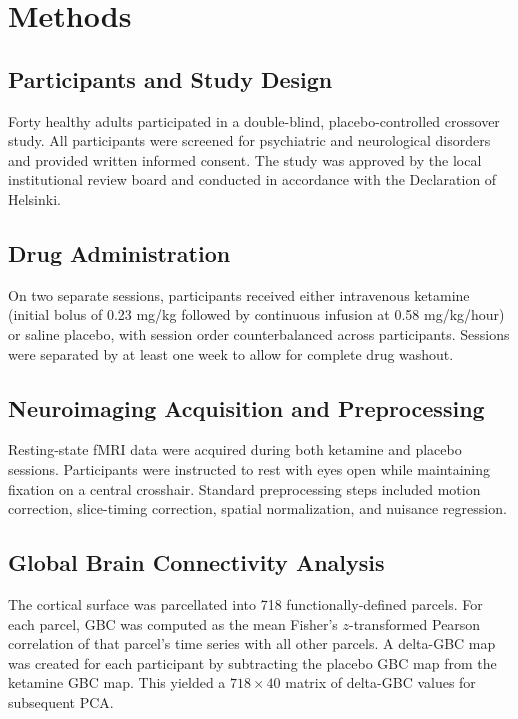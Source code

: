 \documentclass[12pt]{article}
\begin{document}
\section{Methods}

\subsection{Participants and Study Design}

Forty healthy adults participated in a double-blind, placebo-controlled crossover study. All participants were screened for psychiatric and neurological disorders and provided written informed consent. The study was approved by the local institutional review board and conducted in accordance with the Declaration of Helsinki.

\subsection{Drug Administration}

On two separate sessions, participants received either intravenous ketamine (initial bolus of 0.23 mg/kg followed by continuous infusion at 0.58 mg/kg/hour) or saline placebo, with session order counterbalanced across participants. Sessions were separated by at least one week to allow for complete drug washout.

\subsection{Neuroimaging Acquisition and Preprocessing}

Resting-state fMRI data were acquired during both ketamine and placebo sessions. Participants were instructed to rest with eyes open while maintaining fixation on a central crosshair. Standard preprocessing steps included motion correction, slice-timing correction, spatial normalization, and nuisance regression.

\subsection{Global Brain Connectivity Analysis}

The cortical surface was parcellated into 718 functionally-defined parcels. For each parcel, GBC was computed as the mean Fisher's $z$-transformed Pearson correlation of that parcel's time series with all other parcels. A delta-GBC map was created for each participant by subtracting the placebo GBC map from the ketamine GBC map. This yielded a $718 \times 40$ matrix of delta-GBC values for subsequent PCA.
\end{document}
